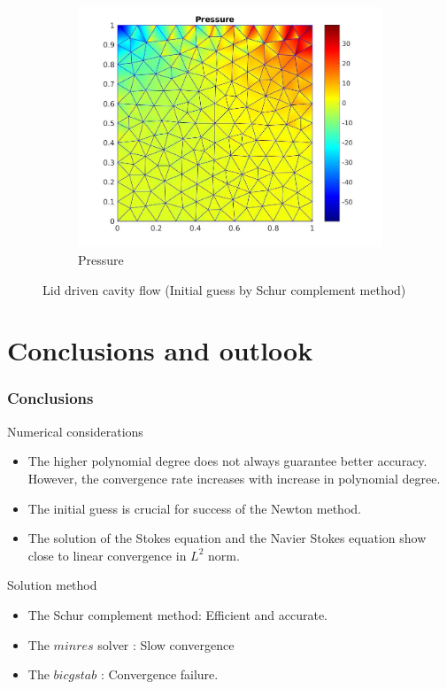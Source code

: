 \documentclass{beamer}
\begin{document}
\begin{frame}
\begin{figure}
\begin{subfigure}{0.3\textwidth}
    \includegraphics[width=\linewidth]{lid_newton_pressure_schur.jpg}
    \caption{Pressure}
  \label{pressure_navier_stoke_schur_lid}
  \end{subfigure}
\caption{Lid driven cavity flow (Initial guess by Schur complement method)}
\label{lid_driven_cavity_n_s_schur}
\end{figure}
\end{frame}
\section{Conclusions and outlook}
\begin{frame}
\frametitle{Conclusions}

\begin{block}{Numerical considerations}
\begin{itemize}
\item The higher polynomial degree does not always guarantee better accuracy. However, the convergence rate increases with increase in polynomial degree.
\item The initial guess is crucial for success of the Newton method.
\item The solution of the Stokes equation and the Navier Stokes equation show close to linear convergence in $L^2$ norm.
\end{itemize}
\end{block}

\begin{block}{Solution method}
\begin{itemize}
\item The Schur complement method: Efficient and accurate.
\item The $minres$ solver : Slow convergence 
\item The $bicgstab$ : Convergence failure.
\end{itemize}
\end{block}

\end{frame}
\end{document}
